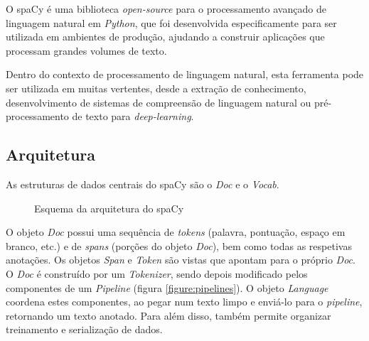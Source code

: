 \documentclass[12pt]{article}
\begin{document}
O spaCy é uma biblioteca \textit{open-source} para o processamento avançado de linguagem natural em \textit{Python}, que foi desenvolvida especificamente para ser utilizada em ambientes de produção, ajudando a construir aplicações que processam grandes volumes de texto.

Dentro do contexto de processamento de linguagem natural, esta ferramenta pode ser utilizada em muitas vertentes, desde a extração de conhecimento, desenvolvimento de sistemas de compreensão de linguagem natural ou pré-processamento de texto para \textit{deep-learning}.



\subsection{Arquitetura} 

As estruturas de dados centrais do spaCy são o \textit{Doc} e o \textit{Vocab}.

\begin{figure}[!ht]
	\centering
	\setlength{\abovecaptionskip}{-.2cm}
	\caption{Esquema da arquitetura do spaCy}
	\label{figure:arquitetura}
\end{figure}

O objeto \textit{Doc} possui uma sequência de \textit{tokens} (palavra, pontuação, espaço em branco, etc.) e de \textit{spans} (porções do objeto \textit{Doc}), bem como todas as respetivas anotações. Os objetos \textit{Span} e \textit{Token} são vistas que apontam para o próprio \textit{Doc}. O \textit{Doc} é construído por um \textit{Tokenizer}, sendo depois modificado pelos componentes de um \textit{Pipeline} (figura \ref{figure:pipelines}). O objeto \textit{Language} coordena estes componentes, ao pegar num texto limpo e enviá-lo para o \textit{pipeline}, retornando um texto anotado. Para além disso, também permite organizar treinamento e serialização de dados.
\end{document}
